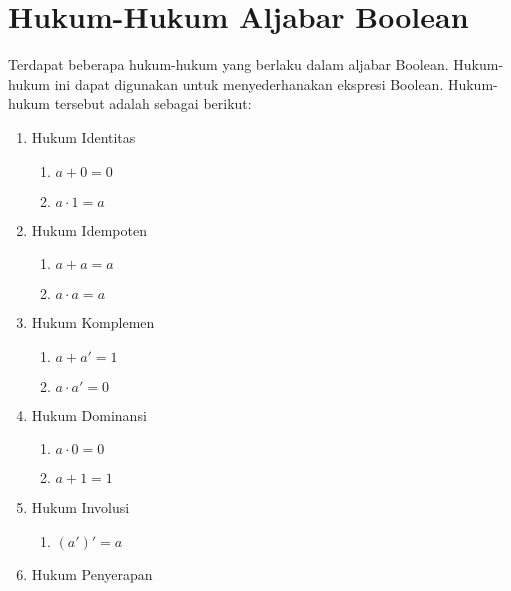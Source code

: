 \documentclass[11pt]{article}
\theoremstyle{definitionstyle}
\theoremstyle{theoremstyle}
\theoremstyle{examplestyle}
\begin{document}
\section{Hukum-Hukum Aljabar Boolean}
Terdapat beberapa hukum-hukum yang berlaku dalam aljabar Boolean. Hukum-hukum ini dapat digunakan untuk menyederhanakan ekspresi Boolean. Hukum-hukum tersebut adalah sebagai berikut:
\begin{multicols}{2}
    \begin{enumerate}[left=0pt, itemsep=1.5pt, topsep=0pt]
        \item Hukum Identitas
        \begin{enumerate}[left=0pt, itemsep=1.5pt, topsep=0pt, label=\roman*)]
            \item $a + 0 = 0$
            \item $a \cdot 1 = a$
        \end{enumerate}
        \item Hukum Idempoten
        \begin{enumerate}[left=0pt, itemsep=1.5pt, topsep=0pt, label=\roman*)]
            \item $a + a = a$
            \item $a \cdot a = a$
        \end{enumerate}
        \item Hukum Komplemen
        \begin{enumerate}[left=0pt, itemsep=1.5pt, topsep=1.5pt, label=\roman*)]
            \item $a + a' = 1$
            \item $a \cdot a' = 0$
        \end{enumerate}
        \item Hukum Dominansi
        \begin{enumerate}[left=0pt, itemsep=1.5pt, topsep=1.5pt, label=\roman*)]
            \item $a \cdot 0 = 0$
            \item $a + 1 = 1$
        \end{enumerate}
        \item Hukum Involusi
        \begin{enumerate}[left=0pt, itemsep=1.5pt, topsep=1.5pt, label=\roman*)]
            \item $(a')' = a$
        \end{enumerate}
        \item Hukum Penyerapan
        \begin{enumerate}[left=0pt, itemsep=1.5pt, topsep=1.5pt, label=\roman*)]

\end{enumerate}
\end{enumerate}
\end{multicols}
\end{document}
